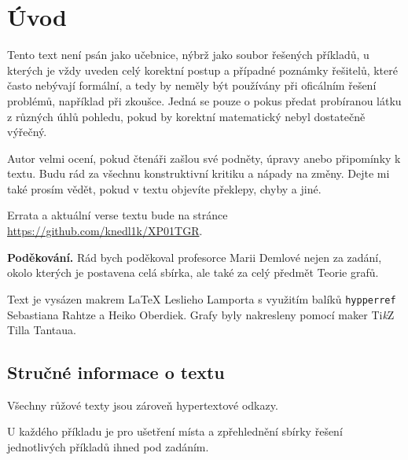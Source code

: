 \section*{Úvod}

\hspace{0.8cm} Tento text není psán jako učebnice, nýbrž jako soubor řešených příkladů, u kterých je vždy uveden celý 
korektní postup a případné poznámky řešitelů, které často nebývají formální, a tedy by neměly být používány při 
oficálním řešení problémů, například při zkoušce. Jedná se pouze o pokus předat probíranou látku z různých úhlů pohledu, 
pokud by korektní matematický nebyl dostatečně výřečný.

\hspace{0.8cm} Autor velmi ocení, pokud čtenáři zašlou své podněty, úpravy anebo připomínky k textu. Budu rád za všechnu 
konstruktivní kritiku a nápady na změny. Dejte mi také prosím vědět, pokud v textu objevíte překlepy, chyby a jiné.

Errata a aktuální verse textu bude na stránce \url{https://github.com/knedl1k/XP01TGR}.

\textbf{Poděkování.} Rád bych poděkoval profesorce Marii Demlové nejen za zadání, okolo kterých je postavena celá 
sbírka, ale také za celý předmět Teorie grafů.

\hspace{0.8cm} Text je vysázen makrem \LaTeX{} Leslieho Lamporta s využitím balíků \texttt{hypperref} \\ 
Sebastiana Rahtze a Heiko Oberdiek. Grafy byly nakresleny pomocí maker Ti\textit{k}Z Tilla Tantaua.

\subsection*{Stručné informace o textu}
Všechny růžové texty jsou zároveň hypertextové odkazy.

U každého příkladu je pro ušetření místa a zpřehlednění sbírky řešení jednotlivých příkladů ihned pod zadáním.
